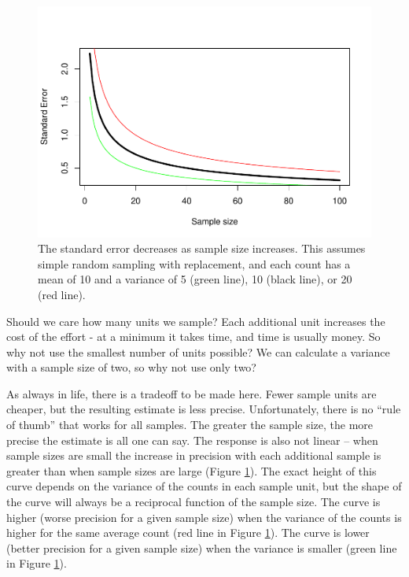 \documentclass[]{book}
\theoremstyle{definition}
\theoremstyle{definition}
\theoremstyle{definition}
\theoremstyle{remark}
\begin{document}
\begin{figure}
\centering
\includegraphics{NRES450-LectureNotes_files/figure-latex/sampleSize-1.pdf}
\caption{\label{fig:sampleSize}The standard error decreases as sample size
increases. This assumes simple random sampling with replacement, and
each count has a mean of 10 and a variance of 5 (green line), 10 (black
line), or 20 (red line).}
\end{figure}

Should we care how many units we sample? Each additional unit increases
the cost of the effort - at a minimum it takes time, and time is usually
money. So why not use the smallest number of units possible? We can
calculate a variance with a sample size of two, so why not use only two?

As always in life, there is a tradeoff to be made here. Fewer sample
units are cheaper, but the resulting estimate is less precise.
Unfortunately, there is no ``rule of thumb'' that works for all samples.
The greater the sample size, the more precise the estimate is all one
can say. The response is also not linear -- when sample sizes are small
the increase in precision with each additional sample is greater than
when sample sizes are large (Figure \ref{fig:sampleSize}). The exact
height of this curve depends on the variance of the counts in each
sample unit, but the shape of the curve will always be a reciprocal
function of the sample size. The curve is higher (worse precision for a
given sample size) when the variance of the counts is higher for the
same average count (red line in Figure \ref{fig:sampleSize}). The curve
is lower (better precision for a given sample size) when the variance is
smaller (green line in Figure \ref{fig:sampleSize}).
\end{document}

